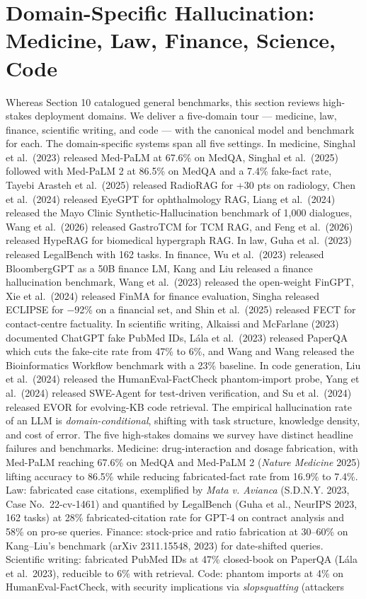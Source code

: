 \documentclass{article}
\begin{document}
\section{Domain-Specific Hallucination: Medicine, Law, Finance, Science, Code}\label{domain-specific-hallucination-medicine-law-finance-science-code}

Whereas Section 10 catalogued general benchmarks, this section reviews high-stakes deployment domains. We deliver a five-domain tour --- medicine, law, finance, scientific writing, and code --- with the canonical model and benchmark for each. The domain-specific systems span all five settings. In medicine, Singhal et al.~(2023) released Med-PaLM at 67.6\% on MedQA, Singhal et al.~(2025) followed with Med-PaLM 2 at 86.5\% on MedQA and a 7.4\% fake-fact rate, Tayebi Arasteh et al.~(2025) released RadioRAG for +30 pts on radiology, Chen et al.~(2024) released EyeGPT for ophthalmology RAG, Liang et al.~(2024) released the Mayo Clinic Synthetic-Hallucination benchmark of 1,000 dialogues, Wang et al.~(2026) released GastroTCM for TCM RAG, and Feng et al.~(2026) released HypeRAG for biomedical hypergraph RAG. In law, Guha et al.~(2023) released LegalBench with 162 tasks. In finance, Wu et al.~(2023) released BloombergGPT as a 50B finance LM, Kang and Liu \citet{liu2023gevalnlgevaluation} released a finance hallucination benchmark, Wang et al.~(2023) released the open-weight FinGPT, Xie et al.~(2024) released FinMA for finance evaluation, Singha \citet{singha2025detectingaihalluci} released ECLIPSE for −92\% on a financial set, and Shin et al.~(2025) released FECT for contact-centre factuality. In scientific writing, Alkaissi and McFarlane (2023) documented ChatGPT fake PubMed IDs, Lála et al.~(2023) released PaperQA which cuts the fake-cite rate from 47\% to 6\%, and Wang and Wang \citet{wang2024factualityoflargel} released the Bioinformatics Workflow benchmark with a 23\% baseline. In code generation, Liu et al.~(2024) released the HumanEval-FactCheck phantom-import probe, Yang et al.~(2024) released SWE-Agent for test-driven verification, and Su et al.~(2024) released EVOR for evolving-KB code retrieval. The empirical hallucination rate of an LLM is \emph{domain-conditional}, shifting with task structure, knowledge density, and cost of error. The five high-stakes domains we survey have distinct headline failures and benchmarks. Medicine: drug-interaction and dosage fabrication, with Med-PaLM \citep{singhal2023largelanguagemodel} reaching 67.6\% on MedQA and Med-PaLM 2 (\emph{Nature Medicine} 2025) lifting accuracy to 86.5\% while reducing fabricated-fact rate from 16.9\% to 7.4\%. Law: fabricated case citations, exemplified by \emph{Mata v. Avianca} (S.D.N.Y. 2023, Case No.~22-cv-1461) and quantified by LegalBench (Guha et al., NeurIPS 2023, 162 tasks) at 28\% fabricated-citation rate for GPT-4 on contract analysis and 58\% on pro-se queries. Finance: stock-price and ratio fabrication at 30--60\% on Kang--Liu's benchmark (arXiv 2311.15548, 2023) for date-shifted queries. Scientific writing: fabricated PubMed IDs at 47\% closed-book on PaperQA (Lála et al.~2023), reducible to 6\% with retrieval. Code: phantom imports at 4\% on HumanEval-FactCheck, with security implications via \emph{slopsquatting} (attackers 
\end{document}
